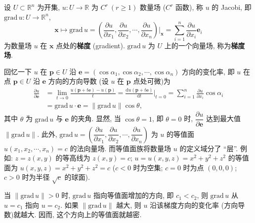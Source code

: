 \begin{definition}\label{def:11.6.3}
设 $U\subset\mathbb{R}^{n}$ 为开集, $u:U\to\mathbb{R}$ 为 $C^{r}\ (r\geqslant1)$ 数量场 ($C^{r}$ 函数), 称 $u$ 的 Jacobi, 即 $\mathrm{grad}\,u:U\to\mathbb{R}^{n}$,
\[
\boldsymbol{x}\mapsto\mathrm{grad}\,u=\left(\frac{\partial u}{\partial x_{1}},\frac{\partial u}{\partial x_{2}},\cdots,\frac{\partial u}{\partial x_{n}}\right)\Big|_{\boldsymbol{x}}=\sum_{i=1}^{n}\frac{\partial u}{\partial x_{i}}\boldsymbol{e}_{i}
\]
为数量场 $u$ 在 $\boldsymbol{x}$ 点处的\textbf{梯度} (gradient). $\mathrm{grad}\,u$ 为 $U$ 上的一个向量场, 称为\textbf{梯度场}.

回忆一下 $u$ 在 $\boldsymbol{p}\in U$ 沿 $\boldsymbol{e}=(\cos\alpha_{1},\cos\alpha_{2},\cdots,\cos\alpha_{n})$ 方向的变化率, 即 $u$ 在点 $\boldsymbol{p}\in U$ 沿 $\boldsymbol{e}$ 方向的方向导数 (设 $u$ 在 $\boldsymbol{p}$ 点处可微)为
\[
\begin{aligned}
\frac{\partial u}{\partial\boldsymbol{e}}&=\lim_{t\to0}\frac{u(\boldsymbol{p}+t\boldsymbol{e})-u(\boldsymbol{p})}{t}=\frac{\mathrm{d}u(\boldsymbol{p}+t\boldsymbol{e})}{\mathrm{d}t}\Big|_{t=0}=\sum_{i=1}^{n}\frac{\partial u}{\partial x_{i}}\cos\alpha_{i}\\
&=\mathrm{grad}\,u\cdot\boldsymbol{e}=\|\mathrm{grad}\,u\|\cos\theta,
\end{aligned}
\]
其中 $\theta$ 为 $\mathrm{grad}\,u$ 与 $\boldsymbol{e}$ 的夹角. 显然, 当 $\cos\theta=1$, 即 $\theta=0$ 时, $\dfrac{\partial u}{\partial\boldsymbol{e}}$ 达到最大值 $\|\mathrm{grad}\,u\|$. 此外, $\mathrm{grad}\,u=\left(\dfrac{\partial u}{\partial x_{1}},\dfrac{\partial u}{\partial x_{2}},\cdots,\dfrac{\partial u}{\partial x_{n}}\right)$ 为 $u$ 的等值面 $u(x_{1},x_{2},\cdots,x_{n})=c$ 的法向量场. 而等值面族将数量场 $u$ 的定义域分了 ``层''. 例如: $z=z(x,y)$ 的等高线为 $z(x,y)=c$; $u=u(x,y,z)=x^{2}+y^{2}+z^{2}$ 的等值面为 $u(x,y,z)=x^{2}+y^{2}+z^{2}=c$ ($c<0$ 时为空集; $c=0$ 时为点 $(0,0,0)$; $c>0$ 时为半径 $\sqrt{c}$ 的球面).

当 $\|\mathrm{grad}\,u\|>0$ 时, $\mathrm{grad}\,u$ 指向等值面增加的方向, 即 $c_{1}<c_{2}$, 则 $\mathrm{grad}\,u$ 从 $u=c_{1}$ 指向 $u=c_{2}$. 如果 $\|\mathrm{grad}\,u\|$ 越大, 则 $u$ 沿该梯度方向的变化率 (方向导数)就越大. 因而, 这个方向上的等值面就越密.
\end{definition}

